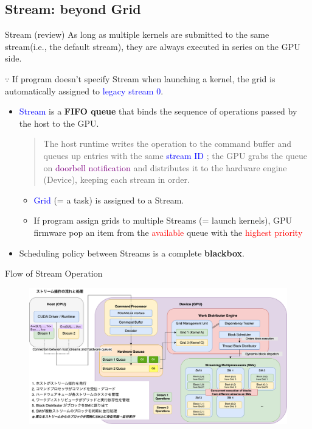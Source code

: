 \documentclass[dvipdfmx, 11pt, aspectratio=169]{beamer}   %
\begin{document}
\subsection{Stream: beyond Grid} %
\begin{frame}{Stream}
  (review) As long as multiple kernels are submitted to the same stream(i.e., the default stream), 
  they are always executed in series on the GPU side.

  $\because$ If program doesn't specify Stream when launching a kernel, the grid is automatically assigned to \textcolor{blue}{legacy stream 0}.
  \begin{itemize}
    \item \textcolor{blue}{Stream} is a \textbf{FIFO queue} that binds the sequence of operations passed by the host to the GPU.
  \begin{quote}
    \vspace{0.2\baselineskip}
    \small
    The host runtime writes the operation to the command buffer and queues up entries with the same \textcolor{blue}{stream ID}
    ; the GPU grabs the queue on \textcolor{purple}{doorbell notification} and distributes it to the hardware engine (Device), keeping each stream in order.
  \end{quote}\vspace{-\baselineskip}
  \begin{itemize}
    \item \textcolor{blue}{Grid} (= a task) is assigned to a Stream.
    \item If program assign grids to multiple Streams (= launch kernels), GPU firmware pop an item from the \textcolor{red}{available} queue with the \textcolor{red}{highest priority}
  \end{itemize}
    \item Scheduling policy between Streams is a complete \textbf{blackbox}.
  \end{itemize}
\end{frame}
\begin{frame}{Flow of Stream Operation}
  \begin{figure}
    \includegraphics[scale=0.08]{img/grid-advanced_ver2.png}
  \end{figure}
\end{frame}
\end{document}
